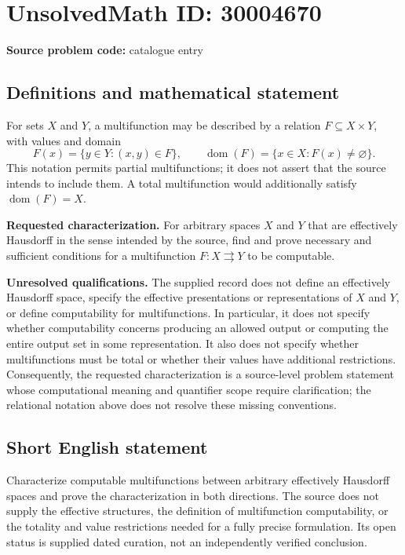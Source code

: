\documentclass[11pt]{article}
\begin{document}
\section*{UnsolvedMath ID: 30004670}
\textbf{Source problem code:} catalogue entry
\subsection{Definitions and mathematical statement}
For sets \(X\) and \(Y\), a multifunction may be described by a relation \(F\subseteq X\times Y\), with values and domain
\[
F(x)=\{y\in Y:(x,y)\in F\},\qquad
\operatorname{dom}(F)=\{x\in X:F(x)\ne\varnothing\}.
\]
This notation permits partial multifunctions; it does not assert that the source intends to include them. A total multifunction would additionally satisfy \(\operatorname{dom}(F)=X\).

\textbf{Requested characterization.} For arbitrary spaces \(X\) and \(Y\) that are effectively Hausdorff in the sense intended by the source, find and prove necessary and sufficient conditions for a multifunction \(F:X\rightrightarrows Y\) to be computable.

\textbf{Unresolved qualifications.} The supplied record does not define an effectively Hausdorff space, specify the effective presentations or representations of \(X\) and \(Y\), or define computability for multifunctions. In particular, it does not specify whether computability concerns producing an allowed output or computing the entire output set in some representation. It also does not specify whether multifunctions must be total or whether their values have additional restrictions. Consequently, the requested characterization is a source-level problem statement whose computational meaning and quantifier scope require clarification; the relational notation above does not resolve these missing conventions.
\subsection{Short English statement}
Characterize computable multifunctions between arbitrary effectively Hausdorff spaces and prove the characterization in both directions. The source does not supply the effective structures, the definition of multifunction computability, or the totality and value restrictions needed for a fully precise formulation. Its open status is supplied dated curation, not an independently verified conclusion.
\end{document}
